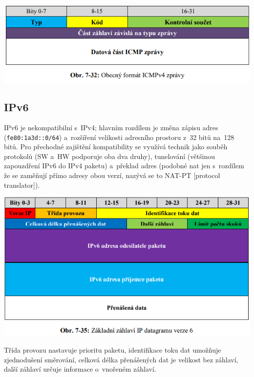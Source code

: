 \begin{center}
	\includegraphics[scale=0.5]{images/-044.png}
\end{center}

\subsection{IPv6}

IPv6 je nekompatibilní s~IPv4; hlavním rozdílem je změna zápisu adres (\texttt{fe80:1a3d::0/64}) a~rozšíření velikosti adresního prostoru z~32 bitů na~128 bitů. Pro přechodné zajištění kompatibility se využívá technik jako souběh protokolů (SW a~HW podporuje oba dva druhy), tunelování (většinou zapouzdření IPv6 do IPv4 paketu) a~překlad adres (podobné nat jen s~rozdílem že se zaměňují přímo adresy obou verzí, nazývá se to NAT-PT [protocol translator]).

\begin{center}
	\includegraphics[scale=0.5]{images/-046.png}
\end{center}

Třída provozu nastavuje prioritu paketu, identifikace toku dat umožňuje zjednodušení směrování, celková délka přenášených dat je velikost bez záhlaví, další záhlaví určuje informace o~vnořeném záhlaví.

